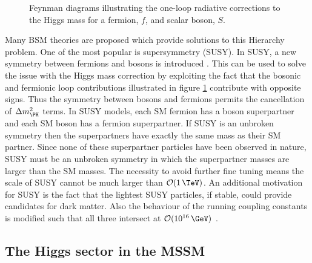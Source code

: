 \begin{figure}[htbp]
\caption{Feynman diagrams illustrating the one-loop radiative corrections to the Higgs
mass for a fermion, $f$, and scalar boson, $S$.}
\label{fig:HiggsMassLoops}
\end{figure}

Many \ac{BSM} theories are proposed which provide solutions to this Hierarchy
problem. One of the most popular is supersymmetry (SUSY). In SUSY, a new
symmetry between fermions and bosons is introduced \cite{Martin:1997ns}. This
can be used to solve the issue with the Higgs mass correction by exploiting the
fact that the bosonic and fermionic loop contributions illustrated in figure
\ref{fig:HiggsMassLoops} contribute with opposite signs. Thus the symmetry
between bosons and fermions permits the cancellation of $\Delta m_{\PH}^{2}$
terms. In SUSY models, each \ac{SM} fermion has a boson superpartner and each
\ac{SM} boson has a fermion superpartner. If SUSY is an unbroken symmetry then
the superpartners have exactly the same mass as their \ac{SM} partner. Since
none of these superpartner particles have been observed in nature, SUSY must be
an unbroken symmetry in which the superpartner masses are larger than the
\ac{SM} masses. The necessity to avoid further fine tuning means the scale of
SUSY cannot be much larger than $\mathcal{O}(1\,\TeV)$. An additional motivation
for SUSY is the fact that the lightest SUSY particles, if stable, could provide
candidates for dark matter. Also the behaviour of the running coupling
constants is modified such that all three intersect at
$\mathcal{O}(10^{16}\,\GeV)$ \cite{Amaldi:1991cn}.

\subsection{The Higgs sector in the MSSM}
\label{sec:mssmhiggs}

